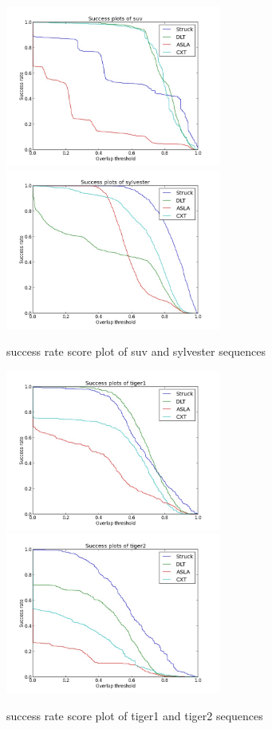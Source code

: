 \documentclass{article}
\begin{document}
\begin{figure}[hbt]
  \includegraphics[width=200pt]{suv.jpg}
  \includegraphics[width=200pt]{sylvester.jpg}
  \caption{success rate score plot of suv and sylvester sequences}
\end{figure}
\label{fig:sylvester}

\begin{figure}[hbt]
  \includegraphics[width=200pt]{tiger1.jpg}
  \includegraphics[width=200pt]{tiger2.jpg}
  \label{fig:tiger2}
  \caption{success rate score plot of tiger1 and tiger2 sequences}
\end{figure}
\end{document}
